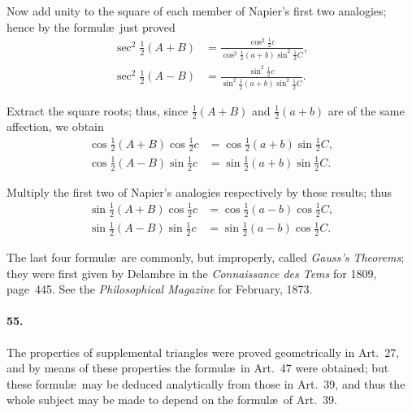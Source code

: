 \documentclass{book}[2004/02/16]
\begin{document}
\begin{mainmatter}
\begin{spacing}{1.3}
Now add unity to the square of each member of Napier's first
two analogies; hence by the formul\ae\ just proved
\begin{align*}
    \sec^{2}\tfrac{1}{2}(A + B) &=
        \frac{\cos^{2}\tfrac{1}{2}c}
        {\cos^{2}\tfrac{1}{2}(a + b)
        \sin^{2}\tfrac{1}{2}C},\\[1ex]
%
    \sec^{2}\tfrac{1}{2}(A - B) &=
        \frac{\sin^{2}\tfrac{1}{2}c}
        {\sin^{2}\tfrac{1}{2}(a + b)
        \sin^{2}\tfrac{1}{2}C}.
\end{align*}

Extract the square roots; thus, since $\frac{1}{2}(A + B)$ and $\frac{1}{2}(a + b)$
are of the same affection, we obtain
\begin{align*}
    \cos\tfrac{1}{2}(A + B)
    \cos\tfrac{1}{2}c &=
    \cos\tfrac{1}{2}(a + b)
    \sin\tfrac{1}{2}C, \tag{1}\\[2ex]
%
    \cos\tfrac{1}{2}(A - B)
    \sin\tfrac{1}{2}c &=
    \sin\tfrac{1}{2}(a + b)
    \sin\tfrac{1}{2}C. \tag{2}
\end{align*}

Multiply the first two of Napier's analogies respectively by
these results; thus
\begin{align*}
    \sin\tfrac{1}{2}(A + B)
    \cos\tfrac{1}{2}c &=
    \cos\tfrac{1}{2}(a - b)
    \cos\tfrac{1}{2}C, \tag{3}\\[2ex]
%
    \sin\tfrac{1}{2}(A - B)
    \sin\tfrac{1}{2}c &=
    \sin\tfrac{1}{2}(a - b)
    \cos\tfrac{1}{2}C. \tag{4}
\end{align*}

The last four formul\ae\ are commonly, but improperly, called
\textit{Gauss's Theorems}; they were first given by Delambre in the
\textit{Connaissance des Tems} for 1809, page~445. See the \textit{Philosophical
Magazine} for February, 1873.

\paragraph{55.} The properties of supplemental triangles were proved
geometrically in Art.~27, and by means of these properties the
formul\ae\ in Art.~47 were obtained; but these formul\ae\ may be
deduced analytically from those in Art.~39, and thus the whole
subject may be made to depend on the formul\ae\ of Art.~39.


\end{spacing}
\end{mainmatter}
\end{document}
